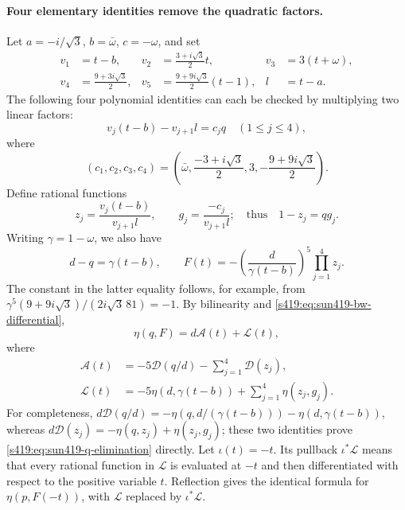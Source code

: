 \documentclass[11pt,a4paper]{article}
\theoremstyle{remark}\newtheorem{remark}[theorem]{Remark}
\numberwithin{equation}{section}
\begin{document}
\paragraph{Four elementary identities remove the quadratic factors.}
Let $a=-i/\sqrt3$, $b=\bar\omega$, $c=-\omega$, and set
\begin{align*}
 v_1&=t-b,&
 v_2&=\tfrac{3+i\sqrt3}{2}t,&
 v_3&=3(t+\omega),\\
 v_4&=\tfrac{9+3i\sqrt3}{2},&
 v_5&=\tfrac{9+9i\sqrt3}{2}(t-1),&
 l&=t-a.
\end{align*}
The following four polynomial identities can each be checked by
multiplying two linear factors:
\begin{equation}\label{s419:eq:sun419-four-polynomials}
 v_j(t-b)-v_{j+1}l=c_jq\quad(1\le j\le4),
\end{equation}
where
\[
 (c_1,c_2,c_3,c_4)=
 \left(\bar\omega,\frac{-3+i\sqrt3}{2},3,
                         -\frac{9+9i\sqrt3}{2}\right).
\]
Define rational functions
\[
 z_j=\frac{v_j(t-b)}{v_{j+1}l},\qquad
 g_j=\frac{-c_j}{v_{j+1}l};
 \quad\text{thus}\quad 1-z_j=qg_j.
\]
Writing $\gamma=1-\omega$, we also have
\[
 d-q=\gamma(t-b),\qquad
 F(t)=-\left(\frac{d}{\gamma(t-b)}\right)^5
                         \prod_{j=1}^4z_j.
\]
The constant in the latter equality follows, for example, from
$\gamma^5(9+9i\sqrt3)/(2i\sqrt3\,81)=-1$.
By bilinearity and \eqref{s419:eq:sun419-bw-differential},
\begin{equation}\label{s419:eq:sun419-q-elimination}
 \eta(q,F)=d\mathcal A(t)+\mathcal L(t),
\end{equation}
where
\begin{align*}
 \mathcal A(t)&=-5\mathcal D(q/d)-\sum_{j=1}^4\mathcal D(z_j),\\
 \mathcal L(t)&=-5\eta(d,\gamma(t-b))+
                                      \sum_{j=1}^4\eta(z_j,g_j).
\end{align*}
For completeness,
$d\mathcal D(q/d)=-\eta(q,d/(\gamma(t-b)))-\eta(d,\gamma(t-b))$,
whereas $d\mathcal D(z_j)=-\eta(q,z_j)+\eta(z_j,g_j)$;
these two identities prove \eqref{s419:eq:sun419-q-elimination} directly.
Let $\iota(t)=-t$. Its pullback $\iota^*\mathcal L$ means that every
rational function in $\mathcal L$ is evaluated at $-t$ and then
differentiated with respect to the positive variable $t$.
Reflection gives the identical formula for $\eta(p,F(-t))$, with
$\mathcal L$ replaced by $\iota^*\mathcal L$.
\end{document}
